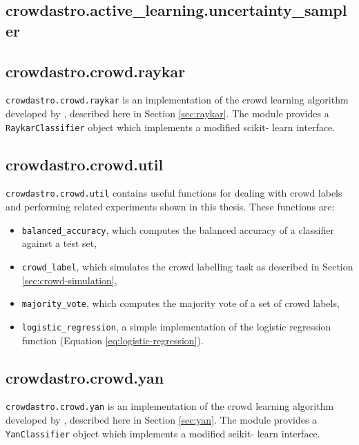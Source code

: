     \subsection{crowdastro.active\_learning.uncertainty\_sampler}
        \label{sec:crowdastro-uncertainty-sampler}

    \subsection{crowdastro.crowd.raykar}
        \label{sec:crowdastro-raykar}

        \texttt{crowdastro.crowd.raykar} is an implementation of the crowd
        learning algorithm developed by \citet{raykar10}, described here in
        Section \ref{sec:raykar}. The module provides a
        \texttt{RaykarClassifier} object which implements a modified scikit-
        learn interface.

    \subsection{crowdastro.crowd.util}
        \label{sec:crowdastro-util}

        \texttt{crowdastro.crowd.util} contains useful functions for dealing
        with crowd labels and performing related experiments shown in this
        thesis. These functions are:
        \begin{itemize}
            \item \texttt{balanced\_accuracy}, which computes the balanced
                accuracy of a classifier against a test set,
            \item \texttt{crowd\_label}, which simulates the crowd labelling
                task as described in Section \ref{sec:crowd-simulation},
            \item \texttt{majority\_vote}, which computes the majority vote of
                a set of crowd labels,
            \item \texttt{logistic\_regression}, a simple implementation of the
                logistic regression function (Equation
                \ref{eq:logistic-regression}).
        \end{itemize}

    \subsection{crowdastro.crowd.yan}
        \label{sec:crowdastro-yan}

        \texttt{crowdastro.crowd.yan} is an implementation of the crowd
        learning algorithm developed by \citet{yan10}, described here in
        Section \ref{sec:yan}. The module provides a
        \texttt{YanClassifier} object which implements a modified scikit-
        learn interface.
